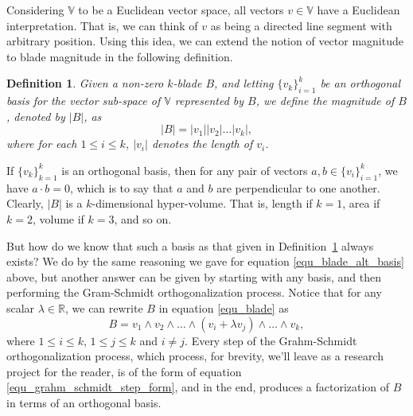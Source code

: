 \documentclass[12pt]{article}
\newcommand{\V}{\mathbb{V}}
\newcommand{\R}{\mathbb{R}}
\newtheorem{definition}{Definition}[section]
\begin{document}
Considering $\V$ to be a Euclidean vector space, all vectors $v\in\V$ have
a Euclidean interpretation.  That is, we can think of $v$ as being a directed
line segment with arbitrary position.  Using this idea, we can extend the notion
of vector magnitude to blade magnitude in the following definition.
\begin{definition}\label{def_blade_mag}
Given a non-zero $k$-blade $B$, and letting $\{v_k\}_{i=1}^k$ be
an orthogonal basis for the vector sub-space of $\V$ represented
by $B$, we define the magnitude of $B$, denoted by $|B|$, as
\begin{equation}
|B| = |v_1||v_2|\dots |v_k|,
\end{equation}
where for each $1\leq i\leq k$, $|v_i|$ denotes the length of $v_i$.
\end{definition}
If $\{v_k\}_{k=1}^k$ is an orthogonal basis, then for any pair of vectors $a,b\in\{v_i\}_{i=1}^k$,
we have $a\cdot b=0$, which is to say that $a$ and $b$ are perpendicular to one another.
Clearly, $|B|$ is a $k$-dimensional hyper-volume.  That is, length if $k=1$, area if $k=2$, volume
if $k=3$, and so on.

But how do we know that such a basis as that given in Definition~\ref{def_blade_mag} always exists?
We do by the same reasoning we gave for equation \eqref{equ_blade_alt_basis} above, but another
answer can be given by starting with any basis, and then performing the
Gram-Schmidt orthogonalization process.  Notice that for any scalar $\lambda\in\R$,
we can rewrite $B$ in equation \eqref{equ_blade} as
\begin{equation}\label{equ_grahm_schmidt_step_form}
B = v_1\wedge v_2\wedge\dots\wedge(v_i+\lambda v_j)\wedge\dots\wedge v_k,
\end{equation}
where $1\leq i\leq k$, $1\leq j\leq k$ and $i\neq j$.  Every step of the Grahm-Schmidt
orthogonalization process, which process, for brevity, we'll leave as a research project for the reader,
is of the form of equation \eqref{equ_grahm_schmidt_step_form}, and in the end, produces
a factorization of $B$ in terms of an orthogonal basis.
\end{document}
